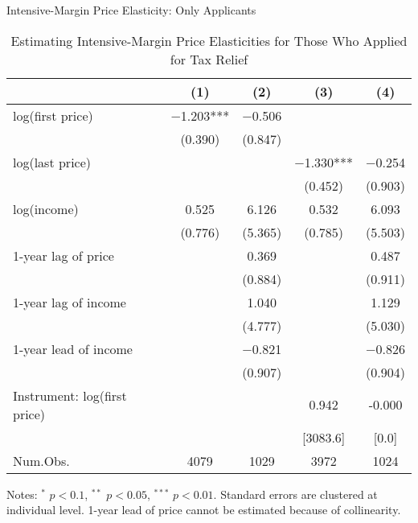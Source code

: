 \documentclass[
  ignorenonframetext,
  aspectratio=169,
]{beamer}
\begin{document}
\begin{frame}{Intensive-Margin Price Elasticity: Only Applicants}
\protect\hypertarget{intensive-margin-price-elasticity-only-applicants}{}
\begin{table}

\caption{\label{tab:intensive-r1-92}Estimating Intensive-Margin Price Elasticities for Those Who Applied for Tax Relief}
\centering
\fontsize{8}{10}\selectfont
\begin{threeparttable}
\begin{tabular}[t]{lcccc}
\toprule
  & (1) & (2) & (3) & (4)\\
\midrule
log(first price) & \num{-1.203}*** & \num{-0.506} &  & \\
 & (\num{0.390}) & (\num{0.847}) &  & \\
log(last price) &  &  & \num{-1.330}*** & \num{-0.254}\\
 &  &  & (\num{0.452}) & (\num{0.903})\\
log(income) & \num{0.525} & \num{6.126} & \num{0.532} & \num{6.093}\\
 & (\num{0.776}) & (\num{5.365}) & (\num{0.785}) & (\num{5.503})\\
1-year lag of price &  & \num{0.369} &  & \num{0.487}\\
 &  & (\num{0.884}) &  & (\num{0.911})\\
1-year lag of income &  & \num{1.040} &  & \num{1.129}\\
 &  & (\num{4.777}) &  & (\num{5.030})\\
1-year lead of income &  & \num{-0.821} &  & \num{-0.826}\\
 &  & (\num{0.907}) &  & (\num{0.904})\\
\midrule
Instrument: log(first price) &  &  & 0.942 & -0.000\\
 &  &  & {}[3083.6] & {}[0.0]\\
Num.Obs. & \num{4079} & \num{1029} & \num{3972} & \num{1024}\\
\bottomrule
\end{tabular}
\begin{tablenotes}
\item Notes: $^{*}$ $p < 0.1$, $^{**}$ $p < 0.05$, $^{***}$ $p < 0.01$. Standard errors are clustered at individual level. 1-year lead of price cannot be estimated because of collinearity.
\end{tablenotes}
\end{threeparttable}
\end{table}
\end{frame}
\end{document}
